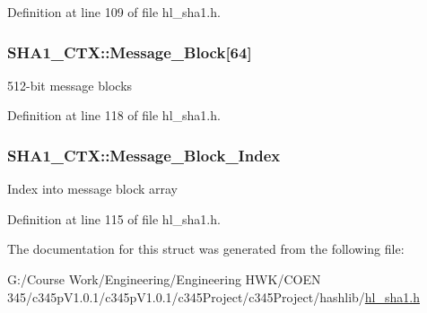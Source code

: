 Definition at line 109 of file hl\_\-sha1.h.\hypertarget{struct_s_h_a1___c_t_x_a54029eb96289c03362de738f6608aa70}{
\subsubsection[{Message\_\-Block}]{ {\bf SHA1\_\-CTX::Message\_\-Block}\mbox{[}64\mbox{]}}}
\label{struct_s_h_a1___c_t_x_a54029eb96289c03362de738f6608aa70}
512-\/bit message blocks 

Definition at line 118 of file hl\_\-sha1.h.\hypertarget{struct_s_h_a1___c_t_x_a201652163346284bc0798699fb96e8df}{
\subsubsection[{Message\_\-Block\_\-Index}]{ {\bf SHA1\_\-CTX::Message\_\-Block\_\-Index}}}
\label{struct_s_h_a1___c_t_x_a201652163346284bc0798699fb96e8df}
Index into message block array 

Definition at line 115 of file hl\_\-sha1.h.

The documentation for this struct was generated from the following file:\begin{DoxyCompactItemize}
\item 
G:/Course Work/Engineering/Engineering HWK/COEN 345/c345pV1.0.1/c345pV1.0.1/c345Project/c345Project/hashlib/\hyperlink{hl__sha1_8h}{hl\_\-sha1.h}\end{DoxyCompactItemize}
